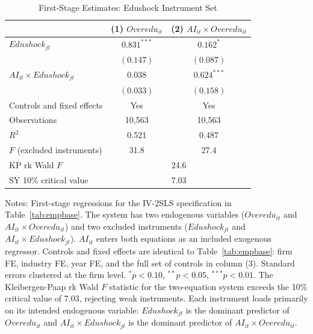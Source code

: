 \documentclass[12pt,a4paper]{article}
\theoremstyle{predstyle}
\theoremstyle{plain}
\newcommand{\Overedu}{\mathit{Overedu}}
\begin{document}
\begin{appendices}
\begin{table}[H]
\centering
\caption{First-Stage Estimates: Edushock Instrument Set}
\label{tab:firststage_edu}
\begin{threeparttable}
\small
\begin{tabular}{lcc}
\toprule
 & (1) \(\Overedu_{it}\) & (2) \(AI_{it} \times \Overedu_{it}\) \\
\midrule
\(Edushock_{jt}\) & \(0.831^{***}\) & \(0.162^{*}\) \\
 & \((0.147)\) & \((0.087)\) \\
\(AI_{it} \times Edushock_{jt}\) & \(0.038\) & \(0.624^{***}\) \\
 & \((0.033)\) & \((0.158)\) \\
Controls and fixed effects & Yes & Yes \\
\midrule
Observations & 10,563 & 10,563 \\
\(R^2\) & 0.521 & 0.487 \\
\(F\) (excluded instruments) & 31.8 & 27.4 \\
KP rk Wald \(F\) & \multicolumn{2}{c}{24.6} \\
SY 10\% critical value & \multicolumn{2}{c}{7.03} \\
\bottomrule
\end{tabular}
\begin{tablenotes}
\footnotesize
\item Notes: First-stage regressions for the IV-2SLS specification in Table~\ref{tab:empbase}. The system has two endogenous variables (\(\Overedu_{it}\) and \(AI_{it} \times \Overedu_{it}\)) and two excluded instruments (\(Edushock_{jt}\) and \(AI_{it} \times Edushock_{jt}\)). \(AI_{it}\) enters both equations as an included exogenous regressor. Controls and fixed effects are identical to Table~\ref{tab:empbase}: firm FE, industry FE, year FE, and the full set of controls in column (3). Standard errors clustered at the firm level. \(^{*}p<0.10\), \(^{**}p<0.05\), \(^{***}p<0.01\). The Kleibergen-Paap rk Wald \(F\) statistic for the two-equation system exceeds the \citet{stock2005testing} 10\% critical value of 7.03, rejecting weak instruments. Each instrument loads primarily on its intended endogenous variable: \(Edushock_{jt}\) is the dominant predictor of \(\Overedu_{it}\) and \(AI_{it} \times Edushock_{jt}\) is the dominant predictor of \(AI_{it} \times \Overedu_{it}\).
\end{tablenotes}
\end{threeparttable}
\end{table}


\end{appendices}
\end{document}
